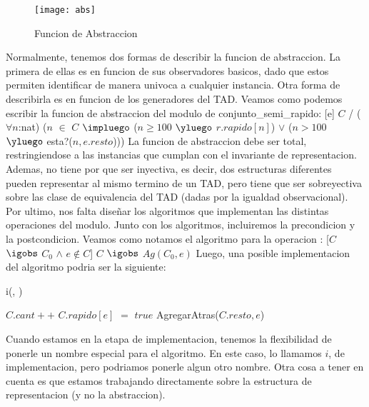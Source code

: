 \documentclass[10pt,a4paper]{article}
\begin{document}
\begin{figure}[h]
	\centering
	\texttt{[image: abs]}
	\caption{Funcion de Abstraccion}
	\label{drivers1}
\end{figure}
\newpage
Normalmente, tenemos dos formas de describir la funcion de abstraccion. La primera de ellas es en funcion de sus observadores basicos, dado que estos permiten identificar de manera univoca a cualquier instancia. Otra forma de describirla es en funcion de los generadores del TAD. Veamos como podemos escribir la funcion de abstraccion del modulo de conjunto\_semi\_rapido:
\newline
\newline
{}[e]{ $C$ / ($\forall n$:nat) ($n$ $\in$ $C$ $\impluego$ ($n \geq 100$ $\yluego$ $r.rapido[n]$) $\lor$ ($n > 100$ $\yluego$ esta?($n,e.resto$)))}
\medskip
\medskip
La funcion de abstraccion debe ser total, restringiendose a las instancias que cumplan con el invariante de representacion. Ademas, no tiene por que ser inyectiva, es decir, dos estructuras diferentes pueden representar al mismo termino de un TAD, pero tiene que ser sobreyectiva sobre las clase de equivalencia del TAD (dadas por la igualdad observacional). Por ultimo, nos falta diseñar los algoritmos que implementan las distintas operaciones del modulo. Junto con los algoritmos, incluiremos la precondicion y la postcondicion. Veamos como notamos el algoritmo para la operacion :
\newline
\newline
{}%
[$C$ $\igobs$ $C_{0}$ $\land$ $e \notin C$]
{$C$ $\igobs$ $Ag(C_{0},e)$}%
\newline
\newline
Luego, una posible implementacion del algoritmo podria ser la siguiente:

\begin{algorithm}[H]{i(, )}
	\begin{algorithmic}[1]
		\State $C.cant++$                      
		\State $C.rapido[e]$ $=$ $true$                      
		\Else
		\State AgregarAtras($C.resto,e$)                     
		\EndIf
		
		\medskip
	\end{algorithmic}
\end{algorithm}


Cuando estamos en la etapa de implementacion, tenemos la flexibilidad de ponerle un nombre
especial para el algoritmo. En este caso, lo llamamos $i$, de implementacion, pero podriamos ponerle algun otro nombre. Otra cosa a tener en cuenta es que estamos trabajando directamente sobre la estructura de representacion (y no la abstraccion).
\newpage
\end{document}
